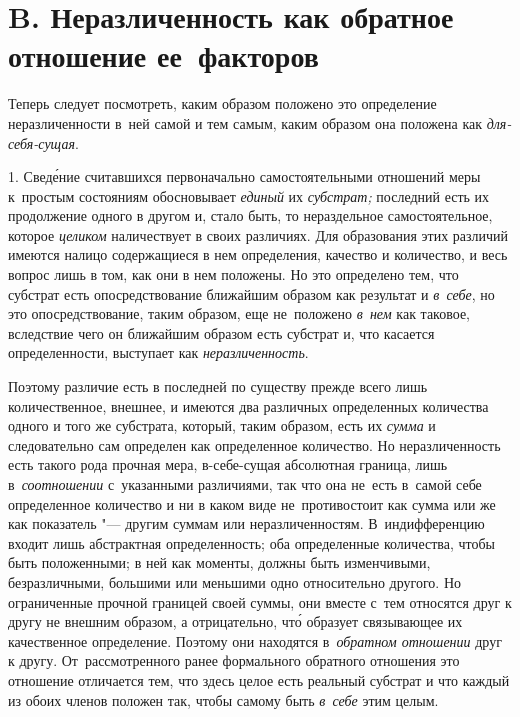 \section[B. Неразличенность как обратное отношение ее факторов]%
{B. Неразличенность как обратное отношение
ее~факторов}

Теперь следует посмотреть, каким образом положено это определение
неразличенности в~ней самой и тем самым, каким образом она положена
как {\em для-себя-сущая}.

1. Свед\'{е}ние считавшихся первоначально самостоятельными отношений меры
к~простым состояниям обосновывает {\em единый} их {\em субстрат;} последний
есть их продолжение одного в другом и, стало быть, то нераздельное
самостоятельное, которое {\em целиком} наличествует в своих различиях.
Для образования этих различий имеются налицо содержащиеся в нем определения,
качество и количество, и весь вопрос лишь в том, как они в нем положены.
Но это определено тем, что субстрат есть опосредствование ближайшим образом
как результат и {\em в~себе}, но это опосредствование, таким образом, еще
не~положено {\em в~нем} как таковое, вследствие чего он ближайшим образом есть
субстрат и, что касается определенности, выступает как {\em неразличенность}.

Поэтому различие есть в последней по существу прежде всего лишь количественное,
внешнее, и имеются два различных определенных количества одного и того же
субстрата, который, таким образом, есть их {\em сумма} и следовательно сам
определен как определенное количество. Но неразличенность есть такого рода
прочная мера, в-себе-сущая абсолютная граница, лишь в~{\em соотношении}
с~указанными различиями, так что она не~есть в~самой себе определенное
количество и ни в каком виде не~противостоит как сумма или же как
показатель "--- другим суммам или неразличенностям. В~индифференцию входит
лишь абстрактная определенность; оба определенные количества, чтобы быть
положенными; в ней как моменты, должны быть изменчивыми, безразличными,
большими или меньшими одно относительно другого. Но ограниченные прочной
границей своей суммы, они вместе с~тем относятся друг к другу не внешним
образом, а отрицательно, чт\'{о} образует связывающее их качественное
определение. Поэтому они находятся в~{\em обратном отношении} друг к другу.
От~рассмотренного ранее формального обратного отношения это отношение
отличается тем, что здесь целое есть реальный субстрат и что каждый из обоих
членов положен так, чтобы самому быть {\em в~себе} этим целым.

